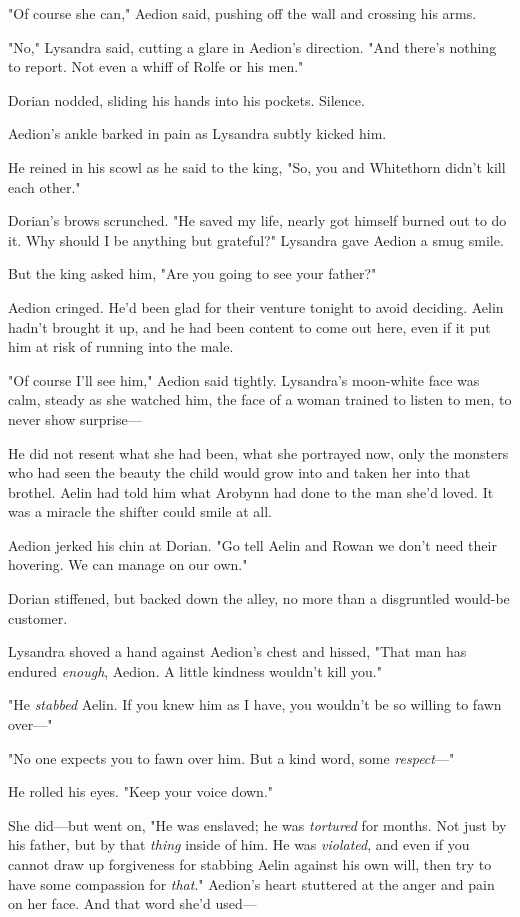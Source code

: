 "Of course she can," Aedion said, pushing off the wall and crossing his arms.

"No," Lysandra said, cutting a glare in Aedion's direction. "And there's nothing to report. Not even a whiff of Rolfe or his men."

Dorian nodded, sliding his hands into his pockets. Silence.

Aedion's ankle barked in pain as Lysandra subtly kicked him.

He reined in his scowl as he said to the king, "So, you and Whitethorn didn't kill each other."

Dorian's brows scrunched. "He saved my life, nearly got himself burned out to do it. Why should I be anything but grateful?" Lysandra gave Aedion a smug smile.

But the king asked him, "Are you going to see your father?"

Aedion cringed. He'd been glad for their venture tonight to avoid deciding. Aelin hadn't brought it up, and he had been content to come out here, even if it put him at risk of running into the male.

"Of course I'll see him," Aedion said tightly. Lysandra's moon-white face was calm, steady as she watched him, the face of a woman trained to listen to men, to never show surprise---

He did not resent what she had been, what she portrayed now, only the monsters who had seen the beauty the child would grow into and taken her into that brothel. Aelin had told him what Arobynn had done to the man she'd loved. It was a miracle the shifter could smile at all.

Aedion jerked his chin at Dorian. "Go tell Aelin and Rowan we don't need their hovering. We can manage on our own."

Dorian stiffened, but backed down the alley, no more than a disgruntled would-be customer.

Lysandra shoved a hand against Aedion's chest and hissed, "That man has endured \emph{enough}, Aedion. A little kindness wouldn't kill you."

"He \emph{stabbed} Aelin. If you knew him as I have, you wouldn't be so willing to fawn over---"

"No one expects you to fawn over him. But a kind word, some
\emph{respect}---"

He rolled his eyes. "Keep your voice down."

She did---but went on, "He was enslaved; he was \emph{tortured} for months. Not just by his father, but by that \emph{thing} inside of him. He was \emph{violated}, and even if you cannot draw up forgiveness for stabbing Aelin against his own will, then try to have some compassion for \emph{that}." Aedion's heart stuttered at the anger and pain on her face. And that word she'd used---

